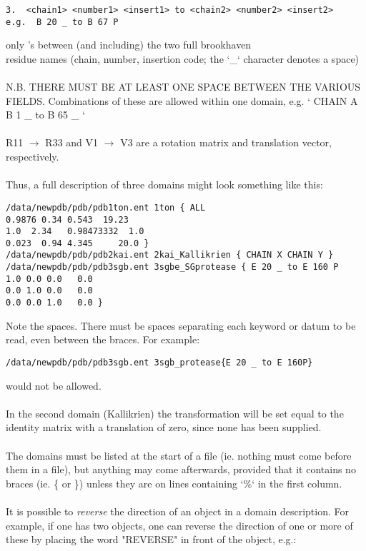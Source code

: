\begin{scriptsize}\begin{verbatim}
3.  <chain1> <number1> <insert1> to <chain2> <number2> <insert2>
e.g.  B 20 _ to B 67 P 
\end{verbatim} \end{scriptsize}
only \Cal's between (and including) the two full brookhaven\\
residue names (chain, number, insertion code;
the `\_` character denotes a space)\\
\\
N.B. THERE MUST BE AT LEAST ONE SPACE BETWEEN THE VARIOUS FIELDS.
Combinations of these are allowed within one domain, e.g. `{ CHAIN A B 1 
\_ to B 65 \_ }`\\
\\
R11 $\rightarrow$ R33 and V1 $\rightarrow$ V3 are a rotation matrix and translation vector, respectively.\\
\\
Thus, a full description of three domains might look something
like this:\\

\begin{scriptsize}\begin{verbatim}
/data/newpdb/pdb/pdb1ton.ent 1ton { ALL 
0.9876 0.34 0.543  19.23
1.0  2.34   0.98473332  1.0
0.023  0.94 4.345     20.0 }
/data/newpdb/pdb/pdb2kai.ent 2kai_Kallikrien { CHAIN X CHAIN Y }
/data/newpdb/pdb/pdb3sgb.ent 3sgbe_SGprotease { E 20 _ to E 160 P 
1.0 0.0 0.0   0.0
0.0 1.0 0.0   0.0
0.0 0.0 1.0   0.0 }
\end{verbatim} \end{scriptsize}

Note the spaces.  There must be spaces separating each keyword or 
datum to be read, even between the braces.  For example:

\begin{scriptsize}
\begin{verbatim}
/data/newpdb/pdb/pdb3sgb.ent 3sgb_protease{E 20 _ to E 160P}
\end{verbatim}\end{scriptsize}

would not be allowed.\\
\\
In the second domain (Kallikrien) the transformation will be set equal
to the identity matrix with a translation of zero, since none has been 
supplied.\\
\\
The domains must be listed at the start of a file (ie. nothing must
come before them in a file), but anything may come afterwards, 
provided that it contains no braces (ie. \{ or \}) unless they are on lines 
containing `\%` in the first column.\\
\\
It is possible to {\em reverse} the direction of an object in a domain
description.  For example, if one has two objects,
one can reverse the direction of one or more of these by placing the
word "REVERSE" in front of the object, e.g.:

